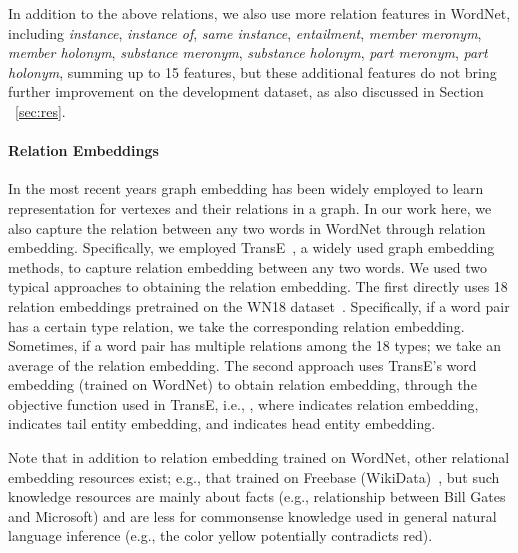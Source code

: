 \documentclass[11pt,a4paper]{article}
\begin{document}
In addition to the above relations, we also use more relation features in WordNet, including \textit{instance}, \textit{instance of}, \textit{same instance}, \textit{entailment}, \textit{member meronym}, \textit{member holonym}, \textit{substance meronym}, \textit{substance holonym}, \textit{part meronym}, \textit{part holonym}, summing up to 15 features, but these additional features do not bring further improvement on the development dataset, as also discussed in Section ~\ref{sec:res}. 

\paragraph{Relation Embeddings} In the most recent years graph embedding has been widely employed to learn representation for vertexes and their relations in a graph. In our work here, we also capture the relation between any two words in WordNet through relation embedding. Specifically, we employed TransE~\citep{DBLP:conf/nips/BordesUGWY13}, a widely used graph embedding methods, to capture relation embedding between any two words. We used two typical approaches to obtaining the relation embedding. The first directly uses 18 relation embeddings pretrained on the WN18 dataset~\citep{DBLP:conf/nips/BordesUGWY13}. Specifically, if a word pair has a certain type relation, we take the corresponding relation embedding. Sometimes, if a word pair has multiple relations among the 18 types; we take an average of the relation embedding. The second approach uses TransE's word embedding (trained on WordNet) to obtain relation embedding, through the objective function used in TransE, i.e., , where  indicates relation embedding,  indicates tail entity embedding, and  indicates head entity embedding. 

Note that in addition to relation embedding trained on WordNet, other relational embedding resources exist; e.g., that trained on Freebase (WikiData)~\citep{DBLP:conf/aaai/BollackerCT07}, but such knowledge resources are mainly about facts (e.g., relationship between Bill Gates and Microsoft) and are less for commonsense knowledge used in general natural language inference (e.g., the color yellow potentially contradicts red).
\end{document}
